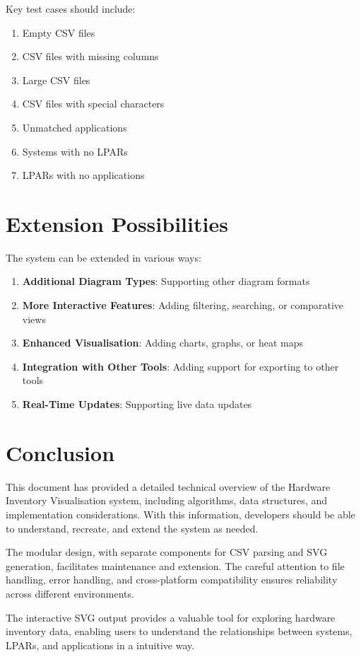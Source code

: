 \documentclass[a4paper,12pt]{article}
\begin{document}
Key test cases should include:
\begin{enumerate}
    \item Empty CSV files
    \item CSV files with missing columns
    \item Large CSV files
    \item CSV files with special characters
    \item Unmatched applications
    \item Systems with no LPARs
    \item LPARs with no applications
\end{enumerate}

\section{Extension Possibilities}

The system can be extended in various ways:

\begin{enumerate}
    \item \textbf{Additional Diagram Types}: Supporting other diagram formats
    \item \textbf{More Interactive Features}: Adding filtering, searching, or comparative views
    \item \textbf{Enhanced Visualisation}: Adding charts, graphs, or heat maps
    \item \textbf{Integration with Other Tools}: Adding support for exporting to other tools
    \item \textbf{Real-Time Updates}: Supporting live data updates
\end{enumerate}

\section{Conclusion}

This document has provided a detailed technical overview of the Hardware Inventory Visualisation system, including algorithms, data structures, and implementation considerations. With this information, developers should be able to understand, recreate, and extend the system as needed.

The modular design, with separate components for CSV parsing and SVG generation, facilitates maintenance and extension. The careful attention to file handling, error handling, and cross-platform compatibility ensures reliability across different environments.

The interactive SVG output provides a valuable tool for exploring hardware inventory data, enabling users to understand the relationships between systems, LPARs, and applications in a intuitive way.
\end{document}
